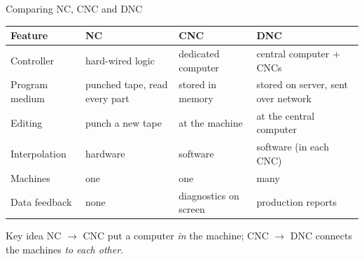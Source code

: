 \documentclass[aspectratio=169]{beamer}
\begin{document}
	\begin{frame}{Comparing NC, CNC and DNC}
		\renewcommand{\arraystretch}{1.1}
		\centering
		\footnotesize
		\begin{tabular}{@{}>{\raggedright}p{2.6cm}>{\raggedright}p{3.4cm}>{\raggedright}p{3.4cm}>{\raggedright\arraybackslash}p{3.6cm}@{}}
			\toprule
			\textbf{Feature} & \textbf{NC} & \textbf{CNC} & \textbf{DNC} \\
			\midrule
			Controller     & hard-wired logic        & dedicated computer            & central computer + CNCs \\
			Program medium & punched tape, read every part & stored in memory       & stored on server, sent over network \\
			Editing        & punch a new tape        & at the machine                & at the central computer \\
			Interpolation  & hardware                & software                      & software (in each CNC) \\
			Machines       & one                     & one                           & many \\
			Data feedback  & none                    & diagnostics on screen         & production reports \\
			\bottomrule
		\end{tabular}
		\vspace{0.3cm}
		\begin{block}{Key idea}
			\small NC $\rightarrow$ CNC put a computer \emph{in} the machine; CNC $\rightarrow$ DNC connects the machines \emph{to each other}.
		\end{block}
	\end{frame}
\end{document}
